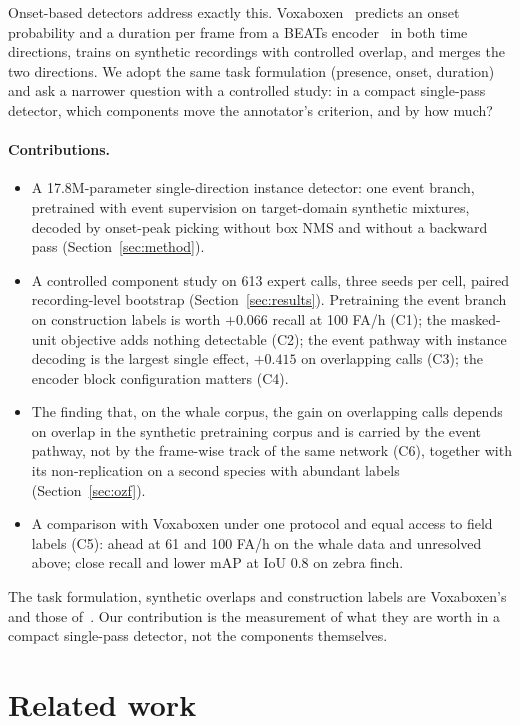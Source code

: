 \documentclass[10pt,twocolumn]{article}
\begin{document}
Onset-based detectors address exactly this. Voxaboxen~\citep{mahon2025voxaboxen} predicts an onset probability and a duration per frame from a BEATs encoder~\citep{chen2023beats} in both time directions, trains on synthetic recordings with controlled overlap, and merges the two directions. We adopt the same task formulation (presence, onset, duration) and ask a narrower question with a controlled study: in a compact single-pass detector, which components move the annotator's criterion, and by how much?

\paragraph{Contributions.}
\begin{itemize}\setlength{\itemsep}{1pt}
\item A 17.8M-parameter single-direction instance detector: one event branch, pretrained with event supervision on target-domain synthetic mixtures, decoded by onset-peak picking without box NMS and without a backward pass (Section~\ref{sec:method}).
\item A controlled component study on 613 expert calls, three seeds per cell, paired recording-level bootstrap (Section~\ref{sec:results}). Pretraining the event branch on construction labels is worth $+0.066$ recall at 100 FA/h (C1); the masked-unit objective adds nothing detectable (C2); the event pathway with instance decoding is the largest single effect, $+0.415$ on overlapping calls (C3); the encoder block configuration matters (C4).
\item The finding that, on the whale corpus, the gain on overlapping calls depends on overlap in the synthetic pretraining corpus and is carried by the event pathway, not by the frame-wise track of the same network (C6), together with its non-replication on a second species with abundant labels (Section~\ref{sec:ozf}).
\item A comparison with Voxaboxen under one protocol and equal access to field labels (C5): ahead at 61 and 100 FA/h on the whale data and unresolved above; close recall and lower mAP at IoU 0.8 on zebra finch.
\end{itemize}
The task formulation, synthetic overlaps and construction labels are Voxaboxen's and those of~\citet{hoffman2025synthetic}. Our contribution is the measurement of what they are worth in a compact single-pass detector, not the components themselves.

\section{Related work}
\end{document}
